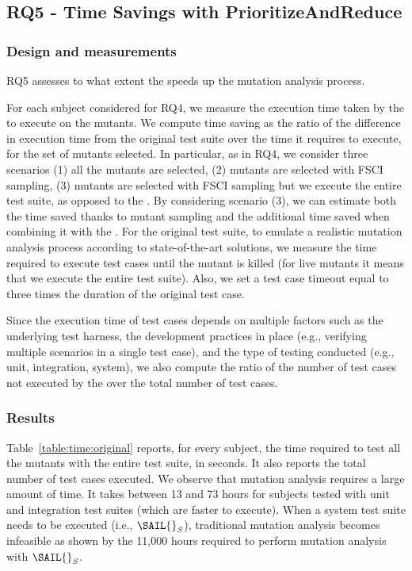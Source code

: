 \subsection{RQ5 - Time Savings with PrioritizeAndReduce}

\subsubsection{Design and measurements}

RQ5 assesses to what extent  the \MPTS speeds up the mutation analysis process.


For each subject considered for RQ4, we measure the execution time taken by the \MPTS to execute on the mutants.
We compute time saving as the ratio of the difference in execution time from the original test suite over the time it requires to execute, for the set of mutants selected.
In particular, as in RQ4, we consider three scenarios (1) all the mutants are selected, (2) mutants are selected with FSCI sampling, (3) mutants are selected with FSCI sampling but we execute the entire test suite, as opposed to the \MPTS. By considering scenario (3), we can estimate both the time saved thanks to mutant sampling and the additional time saved when combining it with the \MPTS.
For the original test suite, to emulate a realistic mutation analysis process according to state-of-the-art solutions, we measure the time required to execute test cases until the mutant is killed (for live mutants it means that we execute the entire test suite). Also, we set a test case timeout equal to three times the duration of the original test case.

Since the execution time of test cases depends on multiple factors such as the underlying test harness, the development practices in place (e.g., verifying multiple scenarios in a single test case), and the type of testing conducted (e.g., unit, integration, system), we also compute
the ratio of the number of test cases not executed by the \MPTS over the total number of test cases.

\subsubsection{Results}

Table~\ref{table:time:original} reports, for every subject, the time required to test all the mutants with the entire test suite, in seconds. It also reports  the total number of test cases executed.
We observe that mutation analysis requires a large amount of time. It takes between 13 and 73 hours for subjects tested with unit and integration test suites (which are faster to execute). When a system test suite needs to be executed (i.e., $\mathit{\SAIL{}_S}$), traditional mutation analysis becomes infeasible as shown by the 11,000 hours required to perform mutation analysis with $\mathit{\SAIL{}_S}$.

